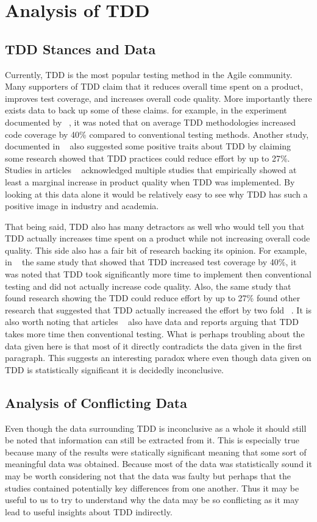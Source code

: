 \documentclass{sig-alternate}
\begin{document}
\section{Analysis of TDD}
\subsection{TDD Stances and Data}
Currently, TDD is the most popular testing method in the Agile community.  Many supporters of TDD claim that it reduces overall time spent on a product, improves test coverage, and increases overall code quality.  More importantly there exists data to back up some of these claims.  for example, in the experiment documented by ~\cite{Lemos:2012}, it was noted that on average TDD methodologies increased code coverage by 40\% compared to conventional testing methods.  Another study, documented in ~\cite{Hellman:2012} also suggested some positive traits about TDD by claiming some research showed that TDD practices could reduce effort by up to 27\%. Studies in articles ~\cite{Hellman:2012, Hammond:2012, Kettunen:2010} acknowledged multiple studies that empirically showed at least a marginal increase in product quality when TDD was implemented.  By looking at this data alone it would be relatively easy to see why TDD has such a positive image in industry and academia.

That being said, TDD also has many detractors as well who would tell you that TDD actually increases time spent on a product while not increasing overall code quality. This side also has a fair bit of research backing its opinion.  For example, in ~\cite{Lemos:2012} the same study that showed that TDD increased test coverage by 40\%, it was noted that TDD took significantly more time to implement then conventional testing and did not actually increase code quality. Also, the same study that found research showing the TDD could reduce effort by up to 27\% found other research that suggested that TDD actually increased the effort by two fold ~\cite{Hellman:2012}. It is also worth noting that articles ~\cite{Hammond:2012, Kettunen:2010} also have data and reports arguing that TDD takes more time then conventional testing.  What is perhaps troubling about the data given here is that most of it directly contradicts the data given in the first paragraph.  This suggests an interesting paradox where even though data given on TDD is statistically significant it is decidedly inconclusive. 

\subsection{Analysis of Conflicting Data}
Even though the data surrounding TDD is inconclusive as a whole it should still be noted that information can still be extracted from it.  This is especially true because many of the results were statically significant meaning that some sort of meaningful data was obtained.   
Because most of the data was statistically sound it may be worth considering not that the data was faulty but perhaps that the studies contained potentially key differences from one another.  Thus it may be useful to us to try to understand why the data may be so conflicting as it may lead to useful insights about TDD indirectly.
\end{document}
